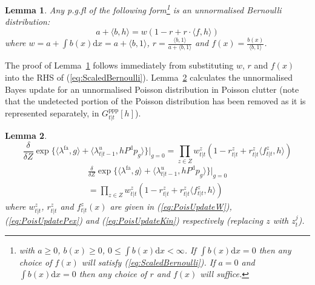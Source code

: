 \documentclass[journal,twoside]{IEEEtran}
\theoremstyle{plain}
\newtheorem{lemma}{Lemma}
\begin{document}
\begin{lemma}\label{lem:ScaledBernoulli}
Any p.g.fl of the following form\footnote{with $a\geq 0$, $b(x)\geq 0$, $0\leq \int{b(x)\mathrm{d} x} < \infty$. If $\int{b(x)\mathrm{d} x}=0$ then any choice of $f(x)$ will satisfy (\ref{eq:ScaledBernoulli}). If $a=0$ and $\int{b(x)\mathrm{d} x}=0$ then any choice of $r$ and $f(x)$ will suffice.} is an unnormalised Bernoulli distribution:
%
\begin{equation}\label{eq:ScaledBernoulli}
a + \langle b,h\rangle = w (1-r + r \cdot \langle f,h\rangle)
\end{equation}
where $w = a + \int{b(x)\mathrm{d} x} = a + \langle b,1\rangle$, $r = \frac{\langle b,1\rangle}{a+\langle b,1\rangle}$ and $f(x) = \frac{b(x)}{\langle b,1\rangle}$.
\end{lemma}
%
The proof of Lemma~\ref{lem:ScaledBernoulli} follows immediately from substituting $w$, $r$ and $f(x)$ into the RHS of (\ref{eq:ScaledBernoulli}). Lemma~\ref{lem:PoisUpdate} calculates the unnormalised Bayes update for an unnormalised Poisson distribution in Poisson clutter (note that the undetected portion of the Poisson distribution has been removed as it is represented separately, in $G^\mathrm{ppp}_{t|t}[h]$).
\begin{lemma}\label{lem:PoisUpdate}
\ifCLASSOPTIONdraftcls
\begin{equation}
\frac{\delta}{\delta Z} \exp\{\langle\lambda^\mathrm{fa},g\rangle + \langle\lambda^u_{t|t-1},h P^{\mathrm{d}} p_g\rangle\}\bigg|_{g=0} 
= \prod_{z\in Z} w_{t|t}^z (1-r_{t|t}^z + r_{t|t}^z \langle f_{t|t}^z,h\rangle) 
\end{equation}
\else
\begin{multline}
\frac{\delta}{\delta Z} \exp\{\langle\lambda^\mathrm{fa},g\rangle + \langle\lambda^u_{t|t-1},h P^{\mathrm{d}} p_g\rangle\}\bigg|_{g=0} \\
= \prod_{z\in Z} w_{t|t}^z (1-r_{t|t}^z + r_{t|t}^z \langle f_{t|t}^z,h\rangle) 
\end{multline}
\fi
%
where $w_{t|t}^z$, $r_{t|t}^z$ and $f_{t|t}^z(x)$ are given in (\ref{eq:PoisUpdateW}), (\ref{eq:PoisUpdatePex}) and (\ref{eq:PoisUpdateKin}) respectively (replacing $z$ with $z_t^j$).
\end{lemma}
\end{document}
